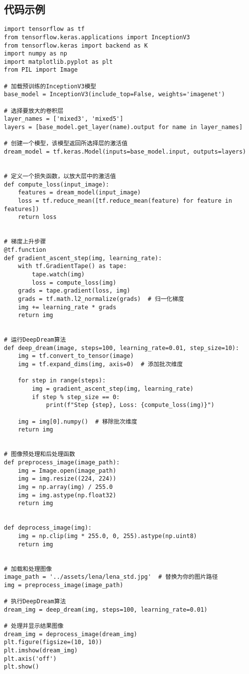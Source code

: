 \subsection*{代码示例}
\begin{lstlisting}
import tensorflow as tf
from tensorflow.keras.applications import InceptionV3
from tensorflow.keras import backend as K
import numpy as np
import matplotlib.pyplot as plt
from PIL import Image

# 加载预训练的InceptionV3模型
base_model = InceptionV3(include_top=False, weights='imagenet')

# 选择要放大的卷积层
layer_names = ['mixed3', 'mixed5']
layers = [base_model.get_layer(name).output for name in layer_names]

# 创建一个模型，该模型返回所选择层的激活值
dream_model = tf.keras.Model(inputs=base_model.input, outputs=layers)


# 定义一个损失函数，以放大层中的激活值
def compute_loss(input_image):
    features = dream_model(input_image)
    loss = tf.reduce_mean([tf.reduce_mean(feature) for feature in features])
    return loss


# 梯度上升步骤
@tf.function
def gradient_ascent_step(img, learning_rate):
    with tf.GradientTape() as tape:
        tape.watch(img)
        loss = compute_loss(img)
    grads = tape.gradient(loss, img)
    grads = tf.math.l2_normalize(grads)  # 归一化梯度
    img += learning_rate * grads
    return img


# 运行DeepDream算法
def deep_dream(image, steps=100, learning_rate=0.01, step_size=10):
    img = tf.convert_to_tensor(image)
    img = tf.expand_dims(img, axis=0)  # 添加批次维度

    for step in range(steps):
        img = gradient_ascent_step(img, learning_rate)
        if step % step_size == 0:
            print(f"Step {step}, Loss: {compute_loss(img)}")

    img = img[0].numpy()  # 移除批次维度
    return img


# 图像预处理和后处理函数
def preprocess_image(image_path):
    img = Image.open(image_path)
    img = img.resize((224, 224))
    img = np.array(img) / 255.0
    img = img.astype(np.float32)
    return img


def deprocess_image(img):
    img = np.clip(img * 255.0, 0, 255).astype(np.uint8)
    return img


# 加载和处理图像
image_path = '../assets/lena/lena_std.jpg'  # 替换为你的图片路径
img = preprocess_image(image_path)

# 执行DeepDream算法
dream_img = deep_dream(img, steps=100, learning_rate=0.01)

# 处理并显示结果图像
dream_img = deprocess_image(dream_img)
plt.figure(figsize=(10, 10))
plt.imshow(dream_img)
plt.axis('off')
plt.show()

\end{lstlisting}


